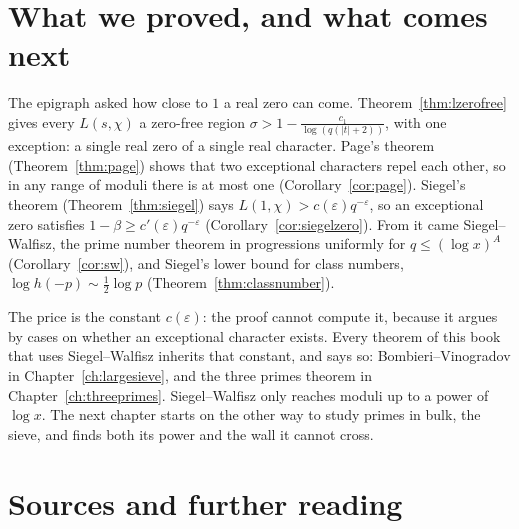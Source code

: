 \section{What we proved, and what comes next}

The epigraph asked how close to $1$ a real zero can come. Theorem~\ref{thm:lzerofree} gives every $L(s,\chi)$ a zero-free region $\sigma>1-\frac{c_1}{\log(q(|t|+2))}$, with one exception: a single real zero of a single real character. Page's theorem (Theorem~\ref{thm:page}) shows that two exceptional characters repel each other, so in any range of moduli there is at most one (Corollary~\ref{cor:page}). Siegel's theorem (Theorem~\ref{thm:siegel}) says $L(1,\chi)>c(\varepsilon)q^{-\varepsilon}$, so an exceptional zero satisfies $1-\beta\ge c'(\varepsilon)q^{-\varepsilon}$ (Corollary~\ref{cor:siegelzero}). From it came Siegel--Walfisz, the prime number theorem in progressions uniformly for $q\le(\log x)^A$ (Corollary~\ref{cor:sw}), and Siegel's lower bound for class numbers, $\log h(-p)\sim\frac12\log p$ (Theorem~\ref{thm:classnumber}).

The price is the constant $c(\varepsilon)$: the proof cannot compute it, because it argues by cases on whether an exceptional character exists. Every theorem of this book that uses Siegel--Walfisz inherits that constant, and says so: Bombieri--Vinogradov in Chapter~\ref{ch:largesieve}, and the three primes theorem in Chapter~\ref{ch:threeprimes}. Siegel--Walfisz only reaches moduli up to a power of $\log x$. The next chapter starts on the other way to study primes in bulk, the sieve, and finds both its power and the wall it cannot cross.

\section*{Sources and further reading}

